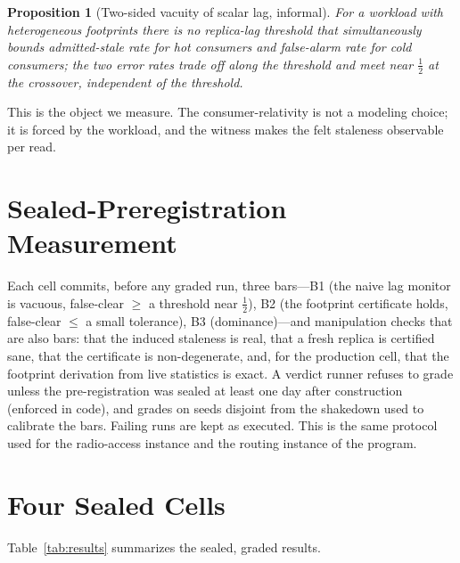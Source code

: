 \documentclass[lettersize,onecolumn]{IEEEtran}
\newtheorem{proposition}{Proposition}
\theoremstyle{remark}
\begin{document}
\begin{proposition}[Two-sided vacuity of scalar lag, informal]
For a workload with heterogeneous footprints there is no replica-lag threshold
that simultaneously bounds admitted-stale rate for hot consumers and false-alarm
rate for cold consumers; the two error rates trade off along the threshold and
meet near $\tfrac12$ at the crossover, independent of the threshold.
\end{proposition}
This is the object we measure. The consumer-relativity is not a modeling choice;
it is forced by the workload, and the witness makes the felt staleness
observable per read.

\section{Sealed-Preregistration Measurement}\label{sec:protocol}
Each cell commits, before any graded run, three bars---B1 (the naive lag monitor
is vacuous, false-clear $\ge$ a threshold near $\tfrac12$), B2 (the footprint
certificate holds, false-clear $\le$ a small tolerance), B3 (dominance)---and
manipulation checks that are also bars: that the induced staleness is real, that
a fresh replica is certified sane, that the certificate is non-degenerate, and,
for the production cell, that the footprint derivation from live statistics is
exact. A verdict runner refuses to grade unless the pre-registration was sealed
at least one day after construction (enforced in code), and grades on seeds
disjoint from the shakedown used to calibrate the bars. Failing runs are kept as
executed. This is the same protocol used for the radio-access instance and the
routing instance of the program.

\section{Four Sealed Cells}\label{sec:cells}
Table~\ref{tab:results} summarizes the sealed, graded results.
\end{document}
